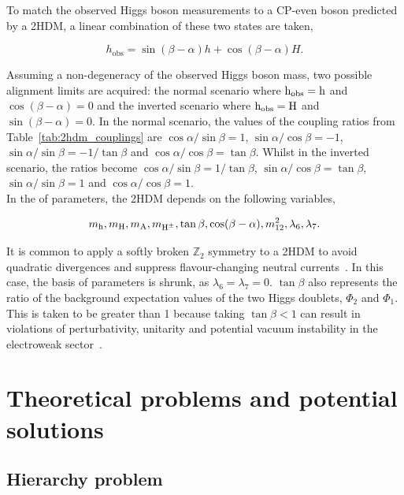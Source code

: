 To match the observed Higgs boson measurements to a \ac{CP}-even boson predicted by a \ac{2HDM}, a linear combination of these two states are taken,

\begin{equation}
h_{\text{obs}} = \sin(\beta-\alpha) h + \cos(\beta-\alpha) H.
\end{equation}

Assuming a non-degeneracy of the observed Higgs boson mass, two possible alignment limits are acquired: the normal scenario where ${\text{h}}_{\text{obs}}={\text{h}}$ and $\cos(\beta-\alpha)=0$ and the inverted scenario where ${\text{h}}_{\text{obs}}={\text{H}}$ and $\sin(\beta-\alpha)=0$.
In the normal scenario, the values of the coupling ratios from Table~\ref{tab:2hdm_couplings} are $\cos\alpha/\sin\beta=1$, $\sin\alpha/\cos\beta=-1$, $\sin\alpha/\sin\beta=-1/\tan\beta$ and $\cos\alpha/\cos\beta=\tan\beta$. 
Whilst in the inverted scenario, the ratios become $\cos\alpha/\sin\beta=1/\tan\beta$, $\sin\alpha/\cos\beta=\tan\beta$, $\sin\alpha/\sin\beta=1$ and $\cos\alpha/\cos\beta=1$. \\

In the  of parameters, the \ac{2HDM} depends on the following variables,

\begin{equation}
m_{{\text{h}}}, m_{{\text{H}}}, m_{{\text{A}}}, m_{{\text{H}^{\pm}}}, \tan\beta, \cos(\beta-\alpha), m_{12}^{2}, \lambda_{6}, \lambda_{7}.
\end{equation}

It is common to apply a softly broken $\mathbb{Z}_2$ symmetry to a \ac{2HDM} to avoid quadratic divergences and suppress flavour-changing neutral currents~\cite{PhysRevD.15.1958,Ginzburg:2004vp}.
In this case, the basis of parameters is shrunk, as $\lambda_6 = \lambda_7 = 0$.
$\tan\beta$ also represents the ratio of the background expectation values of the two Higgs doublets, $\Phi_2$ and $\Phi_1$.
This is taken to be greater than 1 because taking $\tan\beta < 1$ can result in violations of perturbativity, unitarity and potential vacuum instability in the electroweak sector~\cite{SUSY_Primer}.


\section{Theoretical problems and potential solutions}

\subsection{Hierarchy problem}

